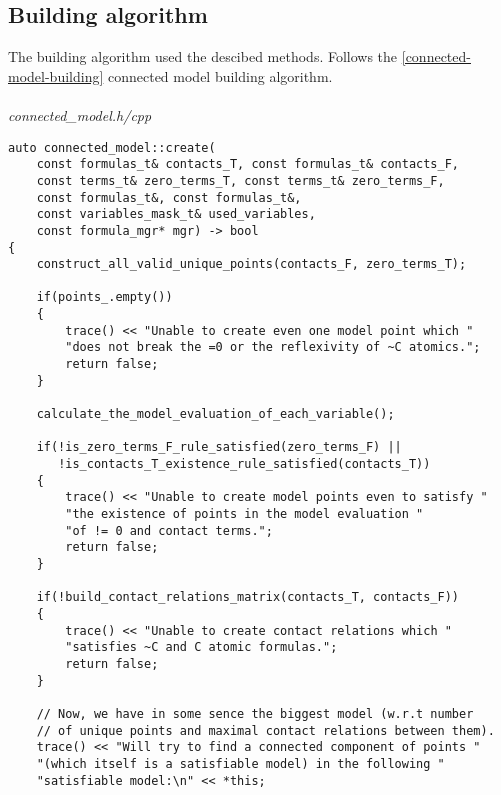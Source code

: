 \documentclass{article}
\begin{document}
	\subsection{Building algorithm}
	The building algorithm used the descibed methods. Follows the \ref{connected-model-building} connected model building algorithm.
\\
\\
\noindent
\textit{connected\_model.h/cpp}
\begin{lstlisting}
auto connected_model::create(
	const formulas_t& contacts_T, const formulas_t& contacts_F,
	const terms_t& zero_terms_T, const terms_t& zero_terms_F,
	const formulas_t&, const formulas_t&,
	const variables_mask_t& used_variables,
	const formula_mgr* mgr) -> bool
{
    construct_all_valid_unique_points(contacts_F, zero_terms_T);

    if(points_.empty())
    {
        trace() << "Unable to create even one model point which "
        "does not break the =0 or the reflexivity of ~C atomics.";
        return false;
    }

    calculate_the_model_evaluation_of_each_variable();

    if(!is_zero_terms_F_rule_satisfied(zero_terms_F) ||
       !is_contacts_T_existence_rule_satisfied(contacts_T))
    {
        trace() << "Unable to create model points even to satisfy "
        "the existence of points in the model evaluation "
        "of != 0 and contact terms.";
        return false;
    }

    if(!build_contact_relations_matrix(contacts_T, contacts_F))
    {
        trace() << "Unable to create contact relations which "
        "satisfies ~C and C atomic formulas.";
        return false;
    }

    // Now, we have in some sence the biggest model (w.r.t number
    // of unique points and maximal contact relations between them).
    trace() << "Will try to find a connected component of points "
    "(which itself is a satisfiable model) in the following "
    "satisfiable model:\n" << *this;
\end{lstlisting}
\newpage
\end{document}
